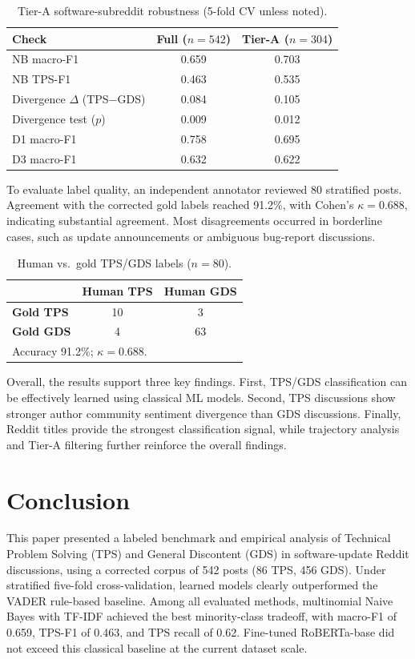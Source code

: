 \documentclass[conference]{IEEEtran}
\begin{document}
\begin{table}[t]
\small
\centering
\caption{Tier-A software-subreddit robustness (5-fold CV unless noted).}
\label{tab:tierA}
\begin{tabular}{lcc}
\hline
\textbf{Check} & \textbf{Full ($n{=}542$)} & \textbf{Tier-A ($n{=}304$)} \\
\hline
NB macro-F1 & 0.659 & 0.703 \\
NB TPS-F1 & 0.463 & 0.535 \\
Divergence $\Delta$ (TPS$-$GDS) & 0.084 & 0.105 \\
Divergence test ($p$) & 0.009 & 0.012 \\
D1 macro-F1 & 0.758 & 0.695 \\
D3 macro-F1 & 0.632 & 0.622 \\
\hline
\end{tabular}
\end{table}

To evaluate label quality, an independent annotator reviewed 80 stratified posts. Agreement with the corrected gold labels reached 91.2\%, with Cohen’s $\kappa{=}0.688$, indicating substantial agreement. Most disagreements occurred in borderline cases, such as update announcements or ambiguous bug-report discussions.

\begin{table}[t]
\small
\centering
\caption{Human vs.\ gold TPS/GDS labels ($n{=}80$).}
\label{tab:human}
\begin{tabular}{lcc}
\hline
 & \textbf{Human TPS} & \textbf{Human GDS} \\
\hline
\textbf{Gold TPS} & 10 & 3 \\
\textbf{Gold GDS} & 4 & 63 \\
\hline
\multicolumn{3}{l}{Accuracy 91.2\%; $\kappa{=}0.688$.} \\
\hline
\end{tabular}
\end{table}

Overall, the results support three key findings. First, TPS/GDS classification can be effectively learned using classical ML models. Second, TPS discussions show stronger author community sentiment divergence than GDS discussions. Finally, Reddit titles provide the strongest classification signal, while trajectory analysis and Tier-A filtering further reinforce the overall findings.

\section{Conclusion}
\label{conclusion}
This paper presented a labeled benchmark and empirical analysis of Technical Problem Solving (TPS) and General Discontent (GDS) in software-update Reddit discussions, using a corrected corpus of 542 posts (86 TPS, 456 GDS). Under stratified five-fold cross-validation, learned models clearly outperformed the VADER rule-based baseline. Among all evaluated methods, multinomial Naive Bayes with TF-IDF achieved the best minority-class tradeoff, with macro-F1 of 0.659, TPS-F1 of 0.463, and TPS recall of 0.62. Fine-tuned RoBERTa-base did not exceed this classical baseline at the current dataset scale.
\end{document}
